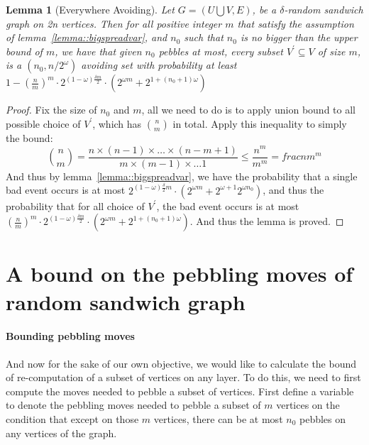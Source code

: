 \documentclass[a4paper, oneside]{article}
\newtheorem{lemma}{Lemma}
\begin{document}
\begin{lemma}[Everywhere Avoiding]\label{lemma::everyavoid}
  Let $G = (U \bigcup V, E)$, be a $\delta$-random sandwich graph on 2n vertices. Then for all positive integer $m$ that satisfy the assumption
  of lemma~\ref{lemma::bigspreadvar}, and $n_0$ such that $n_0$ is no bigger than the upper bound of $m$, we have that given $n_0$ pebbles at most,
  every subset $V^\prime \subseteq V$ of size $m$, is a $(n_0, n/2^\omega)$ avoiding set with probability at least 
  $1 - (\frac{n}{m})^m \cdot 2^{(1-\omega)\frac{\delta m}{2}} \cdot (2^{\omega m} + 2^{1 + (n_0 + 1) \omega})$
\end{lemma}

\begin{proof}
  Fix the size of $n_0$ and $m$, all we need to do is to apply union bound to all possible choice of $V^\prime$, which has $\binom{n}{m}$ in total.
  Apply this inequality to simply the bound:
  \begin{equation}
    \binom{n}{m} = \frac{n \times (n-1) \times \dots \times (n-m+1)}{m \times (m-1) \times \dots 1} \leq
    \frac{n^m}{m^m} = frac{n}{m}^m
  \end{equation}
  And thus by lemma~\ref{lemma::bigspreadvar}, we have the probability that a single bad event occurs is at most 
  $2^{(1-\omega)\frac{\delta}{2}m} \cdot (2^{\omega m}+2^{\omega+1}2^{\omega n_0})$, and thus the probability that
  for all choice of $V^\prime$, the bad event occurs is at most 
  $(\frac{n}{m})^m \cdot 2^{(1-\omega)\frac{\delta m}{2}} \cdot (2^{\omega m} + 2^{1 + (n_0 + 1) \omega})$.
  And thus the lemma is proved.
\end{proof}

\section{A bound on the pebbling moves of random sandwich graph}
\paragraph{Bounding pebbling moves}
And now for the sake of our own objective, we would like to calculate the bound of re-computation of a subset of vertices on any layer. To do this, we
need to first compute the moves needed to pebble a subset of vertices. First define a variable to denote the pebbling moves needed to pebble a subset of
$m$ vertices on the condition that except on those $m$ vertices, there can be at most $n_0$ pebbles on any vertices of the graph.
\end{document}
